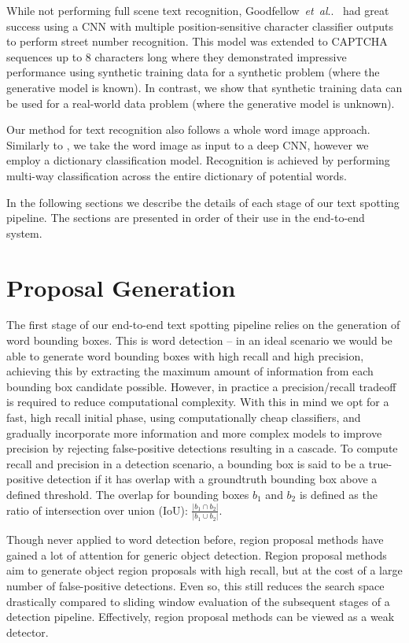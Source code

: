 \documentclass[twocolumn]{svjour3}          \smartqed  \usepackage{epsfig}
\makeatletter
\DeclareRobustCommand\onedot{\futurelet\@let@token\@onedot}
\def\@onedot{\ifx\@let@token.\else.\null\fi\xspace}
\def\etal{\emph{et~al}\onedot}
\makeatother
\begin{document}
While not performing full scene text recognition, Goodfellow~\etal~\cite{Goodfellow13} had great success using a CNN with multiple position-sensitive character classifier outputs to perform street number recognition. This model was extended to CAPTCHA sequences up to 8 characters long where they demonstrated impressive performance using synthetic training data for a synthetic problem (where the generative model is known). In contrast, we show that synthetic training data can be used for a real-world data problem (where the generative model is unknown).

Our method for text recognition also follows a whole word image approach. Similarly to \cite{Goodfellow13}, we take the word image as input to a deep CNN, however we employ a dictionary classification model. Recognition is achieved by performing multi-way classification across the entire dictionary of potential words.

In the following sections we describe the details of each stage of our text spotting pipeline. The sections are presented in order of their use in the end-to-end system.

\section{Proposal Generation}
\label{sec:proposals}

The first stage of our end-to-end text spotting pipeline relies on the generation of word bounding boxes. This is word detection -- in an ideal scenario we would be able to generate word bounding boxes with high recall and high precision, achieving this by extracting the maximum amount of information from each bounding box candidate possible. However, in practice a precision/recall tradeoff is required to reduce computational complexity. With this in mind we opt for a fast, high recall initial phase, using computationally cheap classifiers, and gradually incorporate more information and more complex models to improve precision by rejecting false-positive detections resulting in a cascade. To compute recall and precision in a detection scenario, a bounding box is said to be a true-positive detection if it has overlap with a groundtruth bounding box above a defined threshold. The overlap for bounding boxes $b_1$ and $b_2$ is defined as the ratio of intersection over union (IoU): $\frac{|b_1 \cap b_2|}{|b_1 \cup b_2|}$.

Though never applied to word detection before, region proposal methods have gained a lot of attention for generic object detection. Region proposal methods~\cite{Uijlings13,Alexe12, Cheng14,Zitnick14} aim to generate object region proposals with high recall, but at the cost of a large number of false-positive detections. Even so, this still reduces the search space drastically compared to sliding window evaluation of the subsequent stages of a detection pipeline. Effectively, region proposal methods can be viewed as a weak detector.
\end{document}
